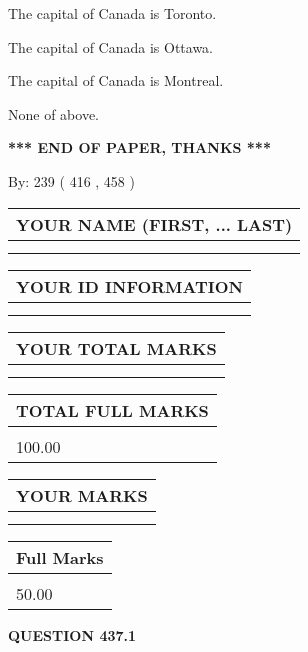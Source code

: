 \documentclass[12pt]{article}
\begin{document}
  
 
 
The capital of Canada is Toronto.
 
 
The capital of Canada is Ottawa.
 
 
The capital of Canada is Montreal.
 
 
 None of above.
 
 
   
   
\vspace{1.0in} 
{\textbf{\large{ *** END OF PAPER, THANKS *** }}} 
   
   
\hspace{1.0in} By: 
 239 ( 416 ,  458 )
   
   
   
   
\newpage 
\setcounter{page}{ 
   437001 } 
   
   
   
   
\noindent\begin{tabular}{|l|}
\hline
YOUR NAME (FIRST, ... LAST)  \\
\hline
 \\ 
 \\ 
\hline
\end{tabular}
\hspace{0.05in} \begin{tabular}{|l|}
\hline
 YOUR   ID   INFORMATION  \\
\hline
 \\ 
 \\ 
\hline
\end{tabular}
   
   
\vspace{0.2in}\noindent\begin{tabular}{|l|}
\hline
YOUR TOTAL MARKS  \\
\hline
 \\ 
 \\ 
\hline
\end{tabular}
\hspace{0.05in} \begin{tabular}{|l|}
\hline
TOTAL FULL MARKS  \\
\hline
 \\ 
100.00 \\
\hline
\end{tabular}
  
\vspace{0.2in}
  
\noindent\begin{tabular}{|l|}
\hline
 YOUR MARKS  \\
\hline
 \\ 
 \\ 
\hline
\end{tabular}
\hspace{0.05in} \begin{tabular}{|l|}
\hline
 Full Marks  \\
\hline
 \\ 
50.00 \\
\hline
\end{tabular}
{\textbf{\Large{QUESTION
437.1 
}}}
  
\end{document}

